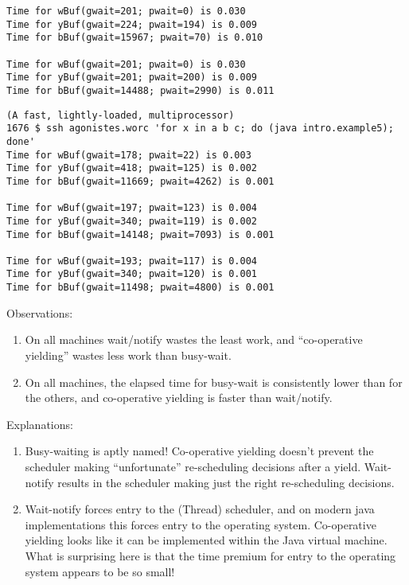 \documentclass{concdistfoils}
\begin{document}
\begin{slide}
\begin{note}
\begin{smaller}
\begin{verbatim}
Time for wBuf(gwait=201; pwait=0) is 0.030
Time for yBuf(gwait=224; pwait=194) is 0.009
Time for bBuf(gwait=15967; pwait=70) is 0.010

Time for wBuf(gwait=201; pwait=0) is 0.030
Time for yBuf(gwait=201; pwait=200) is 0.009
Time for bBuf(gwait=14488; pwait=2990) is 0.011
\end{verbatim}

\begin{verbatim}
(A fast, lightly-loaded, multiprocessor)
1676 $ ssh agonistes.worc 'for x in a b c; do (java intro.example5); done' 
Time for wBuf(gwait=178; pwait=22) is 0.003
Time for yBuf(gwait=418; pwait=125) is 0.002
Time for bBuf(gwait=11669; pwait=4262) is 0.001

Time for wBuf(gwait=197; pwait=123) is 0.004
Time for yBuf(gwait=340; pwait=119) is 0.002
Time for bBuf(gwait=14148; pwait=7093) is 0.001

Time for wBuf(gwait=193; pwait=117) is 0.004
Time for yBuf(gwait=340; pwait=120) is 0.001
Time for bBuf(gwait=11498; pwait=4800) is 0.001
\end{verbatim}
\end{smaller}
Observations:
\begin{enumerate}
\item On all machines wait/notify wastes the least work, and 
      ``co-operative yielding'' wastes less work than busy-wait.
      
\item On all machines, the elapsed time for busy-wait is consistently lower
      than for the others, and co-operative yielding  is faster than
      wait/notify.  
\end{enumerate}

Explanations:
\begin{enumerate}
\item Busy-waiting is aptly named! Co-operative yielding  doesn't prevent the
      scheduler making ``unfortunate'' re-scheduling decisions after a yield. 
      Wait-notify
      results in the scheduler making just the right re-scheduling decisions.
\item Wait-notify forces entry to the
      (Thread) scheduler, and on modern java implementations this
      forces entry to the operating system. Co-operative
      yielding looks like it can be implemented within the
      Java virtual machine. What is surprising here is
      that the time premium for entry to the operating system
      appears to be so small!
\end{enumerate}
\end{note}
\end{slide}
\end{document}
